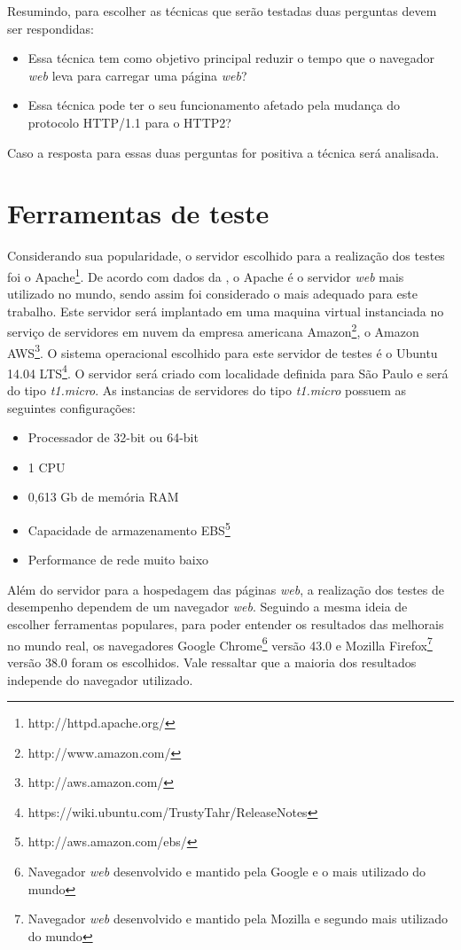Resumindo, para escolher as técnicas que serão testadas duas perguntas devem ser respondidas:

\begin{itemize}
	\item Essa técnica tem como objetivo principal reduzir o tempo que o navegador \textit{web} leva para carregar uma página \textit{web}?
	\item Essa técnica pode ter o seu funcionamento afetado pela mudança do protocolo HTTP/1.1 para o HTTP2?
\end{itemize}

Caso a resposta para essas duas perguntas for positiva a técnica será analisada.

\section{Ferramentas de teste}

Considerando sua popularidade, o servidor escolhido para a realização dos testes foi o Apache\footnote{http://httpd.apache.org/}. De acordo com dados da , o Apache é o servidor \textit{web} mais utilizado no mundo, sendo assim foi considerado o mais adequado para este trabalho. Este servidor será implantado em uma maquina virtual instanciada no serviço de servidores em nuvem da empresa americana Amazon\footnote{http://www.amazon.com/}, o Amazon AWS\footnote{http://aws.amazon.com/}. O sistema operacional escolhido para este servidor de testes é o Ubuntu 14.04 LTS\footnote{https://wiki.ubuntu.com/TrustyTahr/ReleaseNotes}. O servidor será criado com localidade definida para São Paulo e será do tipo \textit{t1.micro}. As instancias de servidores do tipo \textit{t1.micro} possuem as seguintes configurações:

\begin{itemize}
	\item Processador de 32-bit ou 64-bit
	\item 1 CPU
	\item 0,613 Gb de memória RAM
	\item Capacidade de armazenamento EBS\footnote{http://aws.amazon.com/ebs/}
	\item Performance de rede muito baixo
\end{itemize}

Além do servidor para a hospedagem das páginas \textit{web}, a realização dos testes de desempenho dependem de um navegador \textit{web}. Seguindo a mesma ideia de escolher ferramentas populares, para poder entender os resultados das melhorais no mundo real, os navegadores Google Chrome\footnote{Navegador \textit{web} desenvolvido e mantido pela Google e o mais utilizado do mundo} versão 43.0 e Mozilla Firefox\footnote{Navegador \textit{web} desenvolvido e mantido pela Mozilla e segundo mais utilizado do mundo} versão 38.0 foram os escolhidos. Vale ressaltar que a maioria dos resultados independe do navegador utilizado.

